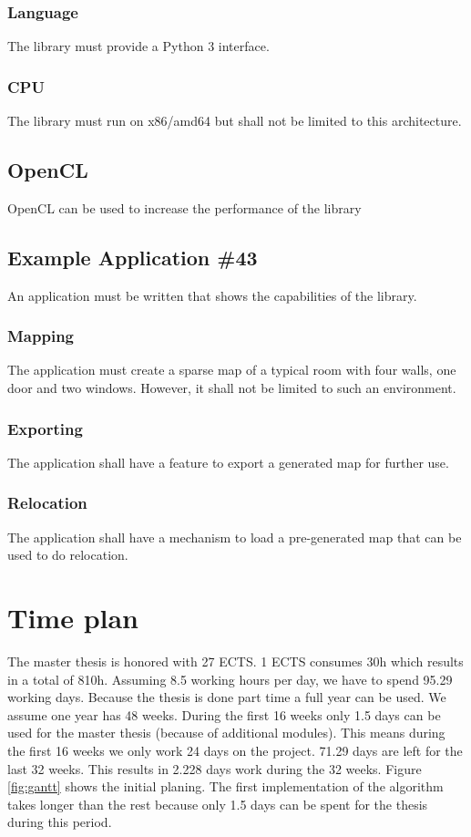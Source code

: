 \documentclass[11pt,a4paper,titlepage,oneside]{report}
\begin{document}
\subsubsection{Language}
The library must provide a Python 3 interface.
\subsubsection{CPU}
The library must run on x86/amd64 but shall not be limited to this architecture.
\subsection{OpenCL}
OpenCL can be used to increase the performance of the library
\subsection{Example Application \#43}
An application must be written that shows the capabilities of the library. 
\subsubsection{Mapping}
The application must create a sparse map of a typical room with four walls, one door and two windows. However, it shall not be limited to such an environment.
\subsubsection{Exporting}
The application shall have a feature to export a generated map for further use.
\subsubsection{Relocation}
The application shall have a mechanism to load a pre-generated map that can be used to do relocation.

\section{Time plan}
The master thesis is honored with 27 ECTS. 1 ECTS consumes 30h which results in a total of 810h. Assuming 8.5 working hours per day, we have to spend 95.29 working days. Because the thesis is done part time a full year can be used. We assume one year has 48 weeks. During the first 16 weeks only 1.5 days can be used for the master thesis (because of additional modules). This means during the first 16 weeks we only work 24 days on the project. 71.29 days are left for the last 32 weeks. This results in 2.228 days work during the 32 weeks. Figure \ref{fig:gantt} shows the initial planing. The first implementation of the algorithm takes longer than the rest because only 1.5 days can be spent for the thesis during this period.
\end{document}
